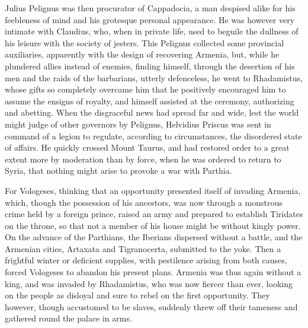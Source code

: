 
Julius Pelignus was then procurator of Cappadocia, a man despised alike for his feebleness of mind and his grotesque personal appearance. He was however very intimate with Claudius, who, when in private life, used to beguile the dullness of his leisure with the society of jesters. This Pelignus collected some provincial auxiliaries, apparently with the design of recovering Armenia, but, while he plundered allies instead of enemies, finding himself, through the desertion of his men and the raids of the barbarians, utterly defenceless, he went to Rhadamistus, whose gifts so completely overcame him that he positively encouraged him to assume the ensigns of royalty, and himself assisted at the ceremony, authorizing and abetting. When the disgraceful news had spread far and wide, lest the world might judge of other governors by Pelignus, Helvidius Priscus was sent in command of a legion to regulate, according to circumstances, the disordered state of affairs. He quickly crossed Mount Taurus, and had restored order to a great extent more by moderation than by force, when he was ordered to return to Syria, that nothing might arise to provoke a war with Parthia.


For Vologeses, thinking that an opportunity presented itself of invading Armenia, which, though the possession of his ancestors, was now through a monstrous crime held by a foreign prince, raised an army and prepared to establish Tiridates on the throne, so that not a member of his house might be without kingly power. On the advance of the Parthians, the Iberians dispersed without a battle, and the Armenian cities, Artaxata and Tigranocerta, submitted to the yoke. Then a frightful winter or deficient supplies, with pestilence arising from both causes, forced Vologeses to abandon his present plans. Armenia was thus again without a king, and was invaded by Rhadamistus, who was now fiercer than ever, looking on the people as disloyal and sure to rebel on the first opportunity. They however, though accustomed to be slaves, suddenly threw off their tameness and gathered round the palace in arms.


